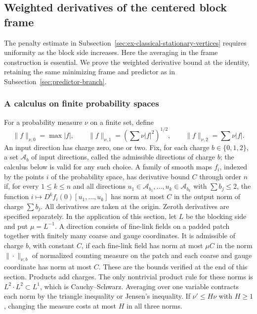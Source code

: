 \subsection{Weighted derivatives of the centered block frame}
\label{sec:ex-weighted-frame-penalty}

The penalty estimate in Subsection~\ref{sec:ex-classical-stationary-vertices}
requires uniformity as the block side increases. Here the averaging in
the frame construction is essential. We prove the weighted derivative
bound at the identity, retaining the same minimizing frame and predictor
as in Subsection~\ref{sec:predictor-branch}.

\subsubsection{A calculus on finite probability spaces}
For a probability measure $\nu$ on a finite set, define
\[
 \|f\|_{\nu,0}=\max|f|,\qquad
 \|f\|_{\nu,1}=\left(\sum\nu|f|^2\right)^{1/2},\qquad
 \|f\|_{\nu,2}=\sum\nu|f|.
\]
An input direction has charge zero, one or two. Fix, for each charge
$b\in\{0,1,2\}$, a set $\mathcal A_b$ of input directions, called the
admissible directions of charge $b$; the calculus below is valid for
any such choice. A family of smooth maps $f_i$, indexed by the points
$i$ of the probability space, has derivative bound $C$ through order
$n$ if, for every $1\leq k\leq n$ and all directions
$u_1\in\mathcal A_{b_1},\ldots,u_k\in\mathcal A_{b_k}$ with
$\sum b_j\leq2$, the function $i\mapsto D^kf_i(0)[u_1,\ldots,u_k]$
has norm at most $C$ in the output norm of charge $\sum b_j$. All
derivatives are taken at the origin. Zeroth derivatives are specified
separately. In the application of this section, let $L$ be the
blocking side and put $\mu=L^{-1}$. A direction consists of
fine-link fields on a padded patch together with finitely many coarse
and gauge coordinates. It is admissible of charge $b$, with constant
$C$, if each fine-link field has norm at most $\mu C$ in the norm
$\|\cdot\|_{\nu,b}$ of normalized counting measure on the patch and
each coarse and gauge coordinate has norm at most $C$. These are the
bounds verified at the end of this section.
Products add charges. The only nontrivial product rule for these norms
is $L^2\cdot L^2\subset L^1$, which is Cauchy--Schwarz. Averaging over
one variable contracts each norm by the triangle inequality or Jensen's
inequality. If $\nu'\leq H\nu$ with $H\geq1$, changing the measure
costs at most $H$ in all three norms.

